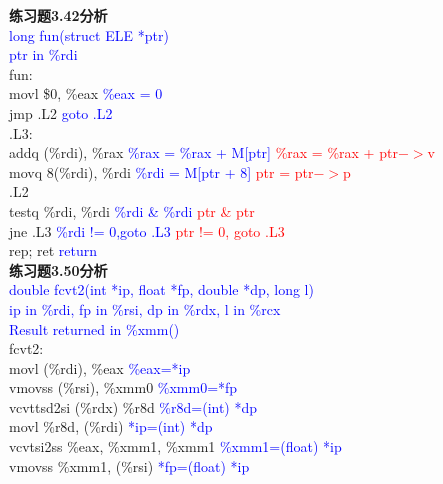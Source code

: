 \documentclass{article}
\newcommand{\blue}[1]{\textcolor{blue}{#1}}
\newcommand{\red}[1]{\textcolor{red}{#1}}
\begin{document}
\begin{CJK}{UTF8}{gbsn}
\textbf{练习题3.42分析}	\\
\blue{long fun(struct ELE *ptr)}	\\
\blue{ptr in \%rdi}	\\
fun:	\\
	\hspace*{1em}movl	\$0, \%eax	\blue{\%eax = 0}	\\
	\hspace*{1em}jmp	.L2		\blue{goto .L2}		\\
.L3:	\\
	\hspace*{1em}addq	(\%rdi), \%rax	\blue{\%rax = \%rax + M[ptr]}	\red{\%rax = \%rax + ptr$->$v}	\\
	\hspace*{1em}movq	8(\%rdi), \%rdi	\blue{\%rdi = M[ptr + 8]}	\red{ptr = ptr$->$p}	\\
.L2	\\
	\hspace*{1em}testq	\%rdi, \%rdi	\blue{\%rdi \& \%rdi}	\red{ptr \& ptr}	\\
	\hspace*{1em}jne	.L3	\blue{\%rdi != 0,goto .L3}	\red{ptr != 0, goto .L3}	\\
	\hspace*{1em}rep; ret		\blue{return}	\\[3ex]
\textbf{练习题3.50分析}	\\[1ex]
\blue{double fcvt2(int *ip, float *fp, double *dp, long l)}\\
\blue{ip in \%rdi, fp in \%rsi, dp in \%rdx, l in \%rcx}	\\
\blue{Result returned in \%xmm()}	\\
fcvt2:	\\
	\hspace*{1em}movl (\%rdi), \%eax \blue{\%eax=*ip}	\\
	\hspace*{1em}vmovss (\%rsi), \%xmm0 \blue{\%xmm0=*fp}	\\
	\hspace*{1em}vcvttsd2si (\%rdx) \%r8d \blue{\%r8d=(int) *dp}	\\
	\hspace*{1em}movl \%r8d, (\%rdi) \blue{*ip=(int) *dp}	\\
	\hspace*{1em}vcvtsi2ss \%eax, \%xmm1, \%xmm1 \blue{\%xmm1=(float) *ip}	\\
	\hspace*{1em}vmovss \%xmm1, (\%rsi) \blue{*fp=(float) *ip}	\\

\end{CJK}
\end{document}
